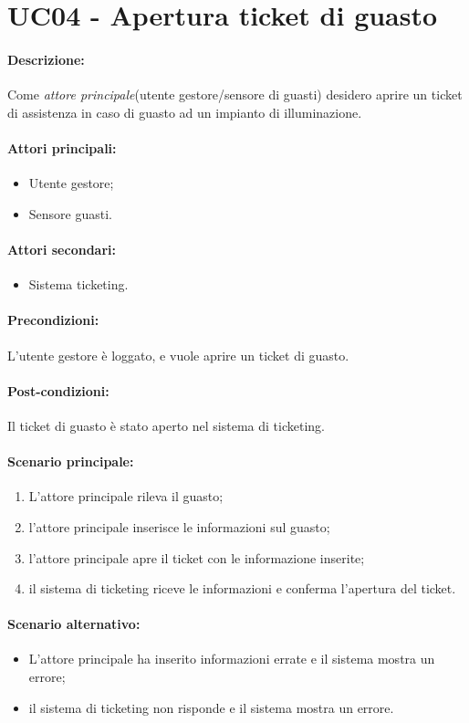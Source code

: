 \section{UC04 - Apertura ticket di guasto}

\paragraph{Descrizione:}
Come \textit{attore principale}(utente gestore/sensore di guasti) desidero aprire un ticket di assistenza in caso di guasto ad un impianto di illuminazione.

\paragraph{Attori principali:}
\begin{itemize}
    \item Utente gestore;
    \item Sensore guasti.
\end{itemize}

\paragraph{Attori secondari:}
\begin{itemize}
    \item Sistema ticketing.
\end{itemize}

\paragraph{Precondizioni:}
L'utente gestore è loggato, e vuole aprire un ticket di guasto.

\paragraph{Post-condizioni:}
Il ticket di guasto è stato aperto nel sistema di ticketing.

\paragraph{Scenario principale:}
\begin{enumerate}
    \item L'attore principale rileva il guasto;
    \item l'attore principale inserisce le informazioni sul guasto;
    \item l'attore principale apre il ticket con le informazione inserite;
    \item il sistema di ticketing riceve le informazioni e conferma l'apertura del ticket.
\end{enumerate}

\paragraph{Scenario alternativo:}
\begin{itemize}
    \item L'attore principale ha inserito informazioni errate e il sistema mostra un errore;
    \item il sistema di ticketing non risponde e il sistema mostra un errore.
\end{itemize}
